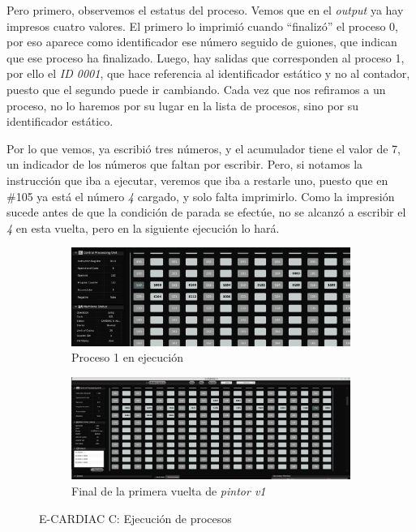 \documentclass[letterpaper,12pt,oneside]{book}
\begin{document}
        Pero primero, observemos el estatus del proceso. Vemos que en
		el \textit{output} ya hay impresos cuatro valores. El primero lo imprimió cuando ``finalizó'' el proceso 0, por eso
		aparece como identificador ese 
		número
		seguido de guiones, que indican que ese proceso ha finalizado. Luego, hay salidas que corresponden al proceso 1, por ello el \textit{ID 0001}, 
		que hace
		referencia al identificador estático y no al contador, puesto que el segundo puede ir cambiando. Cada vez que nos refiramos a un proceso, no lo 
		haremos por su lugar en la lista de procesos, sino por su identificador estático.

  
        Por lo que vemos, ya escribió tres números, y el acumulador
		tiene el valor de 7, un indicador de los números que faltan por escribir. Pero, si notamos la instrucción que iba a ejecutar, veremos que iba a 
		restarle uno, puesto que en \#105 ya está el número \textit{4} cargado, y solo falta imprimirlo. Como la impresión sucede antes de que la 
		condición de 
		parada se efectúe, no se alcanzó a escribir el \textit{4} en esta vuelta, pero en la siguiente ejecución lo hará.


		\begin{figure}[h]
            \centering
            \begin{subfigure}[b]{0.50\textwidth}
                \centering
                \includegraphics[scale=0.4,angle=90]{media/CARDIACC/proceso1Exec1P1.png}
                \caption{Proceso 1 en ejecución}
                \label{fig:proceso1ExecP1}
            \end{subfigure}
            \hfill
            \begin{subfigure}[b]{0.45\textwidth}
                \centering
                \includegraphics[scale=0.28,angle=90]{media/CARDIACC/proceso1Exec1P1Final.png}
                \caption{Final de la primera vuelta de \textit{pintor v1}}
                \label{fig:proceso1Exec1P1Final}
            \end{subfigure}
            \caption{E-CARDIAC C: Ejecución de procesos}
            \label{fig:side_by_side}
        \end{figure}
		
\end{document}
